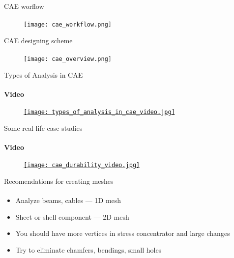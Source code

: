 \documentclass[aspectratio=169]{beamer}
\begin{document}
\begin{frame}[t]{CAE worflow}
\framesubtitle{}
    \vspace{-0.6cm}
    \begin{figure}[H]
        \centering\texttt{[image: cae\_workflow.png]}
        \label{fig:cae_workflow.png}
    \end{figure}
\end{frame}

\begin{frame}[t]{CAE designing scheme}
\framesubtitle{}
    \vspace{-0.6cm}
    \begin{figure}[H]
        \centering\texttt{[image: cae\_overview.png]}
        \label{fig:cae_overview.png}
    \end{figure}
\end{frame}

\begin{frame}[t]{Types of Analysis in CAE}
    \framesubtitle{Video}
    \vspace{-0.6cm}
    \begin{figure}[H]
        \href{https://youtu.be/LyIHUFzO9kE}{
            \centering\texttt{[image: types\_of\_analysis\_in\_cae\_video.jpg]}}
        \label{fig:types_of_analysis_in_cae_video.jpg}
    \end{figure}
\end{frame}

\begin{frame}[t]{Some real life case studies}
    \framesubtitle{Video}
    \vspace{-0.6cm}
    \begin{figure}[H]
        \href{https://youtu.be/BkTJ-PdliC4?t=374}{
            \centering\texttt{[image: cae\_durability\_video.jpg]}}
        \label{fig:cae_durability_video.jpg}
    \end{figure}
\end{frame}

\begin{frame}[t]{Recomendations for creating meshes}
\framesubtitle{}
    \begin{itemize}
        \item Analyze beams, cables --- 1D mesh
        \item Sheet or shell component --- 2D mesh
        \item You should have more vertices in stress concentrator and large changes
        \item Try to eliminate chamfers, bendings, small holes
    \end{itemize}
\end{frame}
\end{document}
